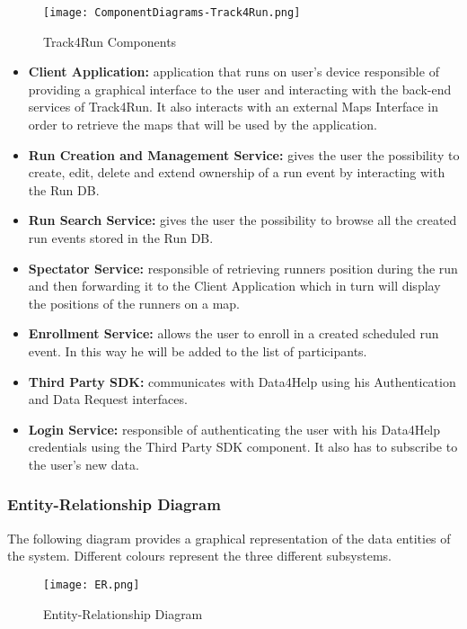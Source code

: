 \FloatBarrier
\begin{figure}[!h]
	\centering
	\texttt{[image: ComponentDiagrams-Track4Run.png]}
	\caption{Track4Run Components}
\end{figure}
\FloatBarrier

\begin{itemize}
	\item \textbf{Client Application:} application that runs on user's device responsible of providing a graphical interface to the user and interacting with the back-end services of Track4Run. It also interacts with an external Maps Interface in order to retrieve the maps that will be used by the application.
	\item \textbf{Run Creation and Management Service:} gives the user the possibility to create, edit, delete and extend ownership of a run event by interacting with the Run DB.
	\item \textbf{Run Search Service:} gives the user the possibility to browse all the created run events stored in the Run DB.
	\item \textbf{Spectator Service:} responsible of retrieving runners position during the run and then forwarding it to the Client Application which in turn will display the positions of the runners on a map.
	\item \textbf{Enrollment Service:} allows the user to enroll in a created scheduled run event. In this way he will be added to the list of participants.
	\item \textbf{Third Party SDK:} communicates with Data4Help using his Authentication and Data Request interfaces.
	\item \textbf{Login Service:} responsible of authenticating the user with his Data4Help credentials using the Third Party SDK component. It also has to subscribe to the user's new data.
\end{itemize}

\subsubsection{Entity-Relationship Diagram}
The following diagram provides a graphical representation of the data entities of the system. Different colours represent the three different subsystems.

\FloatBarrier
\begin{figure}[!h]
	\centering
	\texttt{[image: ER.png]}
	\caption{Entity-Relationship Diagram}
\end{figure}
\FloatBarrier

